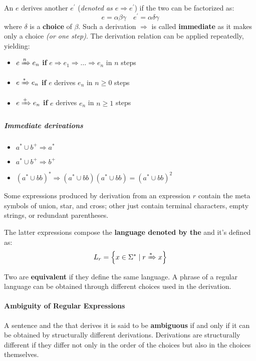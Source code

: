 \documentclass[english]{article}
\begin{document}
An \re \(e\) derives another \re \(e^\prime\) (\textit{denoted as \(e \Rightarrow e^\prime\)}) if the two \re can be factorized as:
\[ e = \alpha\beta\gamma \quad e^\prime = \alpha\delta\gamma \]
where \(\delta\) is a \textbf{choice} of \(\beta\).
Such a derivation \(\Rightarrow\) is called \textbf{immediate} as it makes only a choice \textit{(or one step)}.
The derivation relation can be applied repeatedly, yielding:

\begin{itemize}
  \item \(e \xRightarrow{n} e_n\) \textbf{if} \(e \Rightarrow e_1 \Rightarrow \ldots \Rightarrow e_n\) in \(n\) steps
  \item \(e \xRightarrow{\ast} e_n\) \textbf{if} \(e\) derives \(e_n\) in \(n \geq 0\) steps
  \item \(e \xRightarrow{+} e_n\) \textbf{if} \(e\) derives \(e_n\) in \(n \geq 1\) steps
\end{itemize}

\subparagraph*{Immediate derivations}

\begin{itemize}
  \item \(a^\ast \cup b^+ \Rightarrow a^\ast\)
  \item \(a^\ast \cup b^+ \Rightarrow b^+\)
  \item \(\left(a^\ast \cup b b\right)^\ast \Rightarrow \left(a^\ast \cup bb\right) \left(a^\ast \cup bb\right) = \left(a^\ast \cup bb \right)^2\)
\end{itemize}

\bigskip
Some expressions produced by derivation from an expression \(r\) contain the meta symbols of union, star, and cross;
other just contain terminal characters, empty strings, or redundant parentheses.

The latter expressions compose the \textbf{language denoted by the \re} and it's defined as:
\[L_r = \left\{x \in \Sigma^\ast \mid r \xRightarrow{\ast} x \right\}\]

Two \re are \textbf{equivalent} if they define the same language.
A phrase of a regular language can be obtained through different choices used in the derivation.

\paragraph{Ambiguity of Regular Expressions}

A sentence and the \re that derives it is said to be \textbf{ambiguous} if and only if it can be obtained by structurally different derivations.
Derivations are structurally different if they differ not only in the order of the choices but also in the choices themselves.
\end{document}

